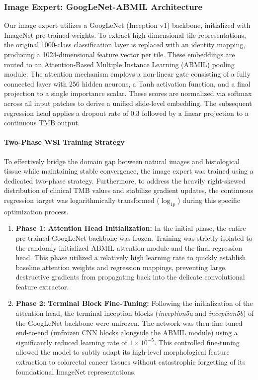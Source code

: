 \documentclass[11pt,a4paper]{article}
\begin{document}
\subsubsection{Image Expert: GoogLeNet-ABMIL Architecture}
Our image expert utilizes a GoogLeNet (Inception v1) backbone, initialized with ImageNet pre-trained weights. To extract high-dimensional tile representations, the original 1000-class classification layer is replaced with an identity mapping, producing a 1024-dimensional feature vector per tile. These embeddings are routed to an Attention-Based Multiple Instance Learning (ABMIL) pooling module. The attention mechanism employs a non-linear gate consisting of a fully connected layer with 256 hidden neurons, a Tanh activation function, and a final projection to a single importance scalar. These scores are normalized via softmax across all input patches to derive a unified slide-level embedding. The subsequent regression head applies a dropout rate of 0.3 followed by a linear projection to a continuous TMB output.

\paragraph{Two-Phase WSI Training Strategy}
To effectively bridge the domain gap between natural images and histological tissue while maintaining stable convergence, the image expert was trained using a dedicated two-phase strategy. Furthermore, to address the heavily right-skewed distribution of clinical TMB values and stabilize gradient updates, the continuous regression target was logarithmically transformed ($\log_{1p}$) during this specific optimization process.

\begin{enumerate}
    \item \textbf{Phase 1: Attention Head Initialization:} In the initial phase, the entire pre-trained GoogLeNet backbone was frozen. Training was strictly isolated to the randomly initialized ABMIL attention module and the final regression head. This phase utilized a relatively high learning rate to quickly establish baseline attention weights and regression mappings, preventing large, destructive gradients from propagating back into the delicate convolutional feature extractor.

    \item \textbf{Phase 2: Terminal Block Fine-Tuning:} Following the initialization of the attention head, the terminal inception blocks (\textit{inception5a} and \textit{inception5b}) of the GoogLeNet backbone were unfrozen. The network was then fine-tuned end-to-end (unfrozen CNN blocks alongside the ABMIL module) using a significantly reduced learning rate of $1\times 10^{-5}$. This controlled fine-tuning allowed the model to subtly adapt its high-level morphological feature extraction to colorectal cancer tissues without catastrophic forgetting of its foundational ImageNet representations.
\end{enumerate}
\end{document}
